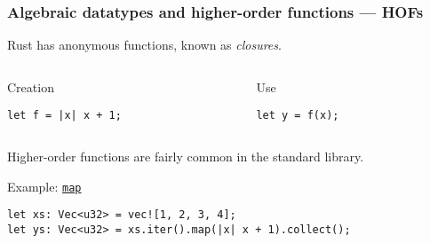 \documentclass[t]{beamer}
\begin{document}
\begin{frame}[fragile]
\frametitle{Algebraic datatypes and higher-order functions --- HOFs}

Rust has anonymous functions, known as \emph{closures}.

\begin{columns}

\begin{column}[T]{0.48\textwidth}
\begin{block}{Creation}
\small
\begin{verbatim}
let f = |x| x + 1;
\end{verbatim}
\end{block}
\end{column}

\begin{column}[T]{0.48\textwidth}
\begin{block}{Use}
\small
\begin{verbatim}
let y = f(x);
\end{verbatim}
\end{block}
\end{column}

\end{columns}

\bigskip

Higher-order functions are fairly common in the standard library.

\begin{block}{Example: \href{https://doc.rust-lang.org/std/iter/struct.Map.html}{\texttt{map}}}
\begin{verbatim}
let xs: Vec<u32> = vec![1, 2, 3, 4];
let ys: Vec<u32> = xs.iter().map(|x| x + 1).collect();
\end{verbatim}
\end{block}

\end{frame}
\end{document}
